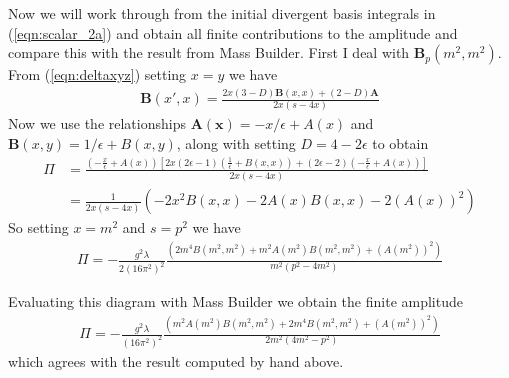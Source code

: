 \documentclass[11pt]{article}
\newcommand{\mb}{\textsf{Mass Builder} }
\newcommand{\mbs}{\textsf{Mass Builder}}
\begin{document}
Now we will work through from the initial divergent basis integrals in (\ref{eqn:scalar_2a}) and obtain all finite contributions to the amplitude and compare this with the result from \mbs.  First I deal with $\mathbf{B}_p(m^2,m^2)$.  From (\ref{eqn:deltaxyz}) setting $x=y$ we have
\begin{align}
\mathbf{B}(x',x) = \frac{2x(3-D)\mathbf{B}(x,x)+(2-D)\mathbf{A}}{2x(s-4x)}
\end{align}
Now we use the relationships $\mathbf{A(x)} = -x/\epsilon +A(x)$ and $\mathbf{B}(x,y) = 1/\epsilon + B(x,y)$, along with setting $D = 4-2\epsilon$ to obtain
\begin{align*}
\Pi &= \frac{\left( -\frac{x}{\epsilon}+A(x)\right)\left[2x(2\epsilon-1)\left( \frac{1}{\epsilon}+B(x,x)\right) + (2\epsilon-2)\left(-\frac{x}{\epsilon}+A(x)\right)\right]}{2x(s-4x)}\\
&= \frac{1}{2x(s-4x)} \left(-2x^2B(x,x)-2A(x)B(x,x)-2(A(x))^2\right)
\end{align*}
So setting $x=m^2$ and $s=p^2$ we have
\begin{align}
\Pi = -\frac{g^2\lambda}{2(16\pi^2)^2} \frac{\left(2m^4B(m^2,m^2)+m^2A(m^2)B(m^2,m^2)+(A(m^2))^2\right)}{m^2(p^2-4m^2)}
\end{align}

Evaluating this diagram with \mb we obtain the finite amplitude
\begin{align}
\Pi = -\frac{g^2\lambda}{(16\pi^2)^2} \frac{ \left(m^2A(m^2)B(m^2,m^2) + 2m^4B(m^2,m^2) + (A(m^2))^2 \right) }{ 2m^2 (4m^2-p^2)}
\end{align}
which agrees with the result computed by hand above.
\end{document}
